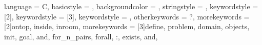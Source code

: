 
{
    language = C,
    basicstyle = {\tiny \ttfamily \color{main-color}},
    backgroundcolor = {\color{back-color}},
    stringstyle = {\color{string-color}},
    keywordstyle = [2]{\color{pred-color}},
    keywordstyle = [3]{\color{key-color}},
    keywordstyle = {\color{term-color}},
    otherkeywords = {?},
    morekeywords = [2]{ontop, inside, inroom},
    morekeywords = [3]{define, problem, domain, objects, init, goal, and, for_n_pairs, forall, :, exists, and},
}

